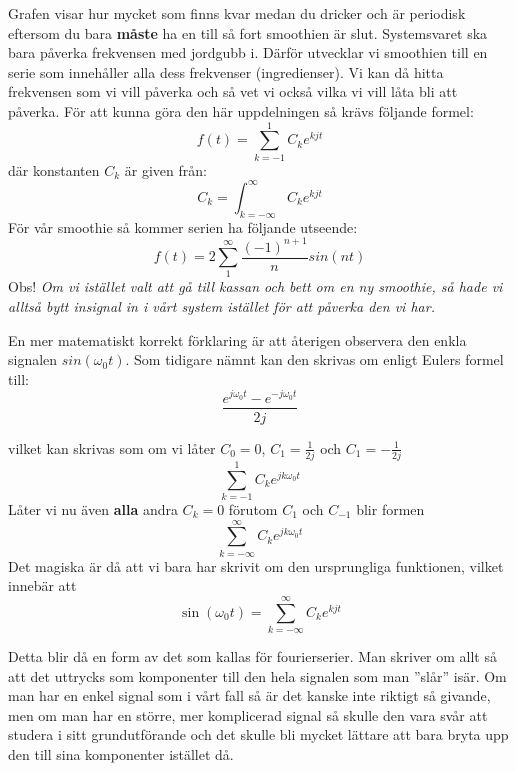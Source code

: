 \documentclass{article}
\begin{document}
Grafen visar hur mycket som finns kvar medan du dricker och är periodisk
eftersom du bara \textbf{måste} ha en till så fort smoothien är slut.
Systemsvaret ska bara påverka frekvensen med jordgubb i.
Därför utvecklar vi smoothien till en serie som innehåller alla dess
frekvenser (ingredienser). Vi kan då hitta frekvensen som vi vill påverka och
så vet vi också vilka vi vill låta bli att påverka.
För att kunna göra den här uppdelningen så krävs följande formel:
\begin{displaymath}
  f(t) = \sum_{k=-1}^1 C_k e^{k j t}
\end{displaymath}
där konstanten $C_k$ är given från:
\begin{displaymath}
  C_k = \int_{k=-\infty}^{\infty} C_k e^{k j t}
\end{displaymath}
För vår smoothie så kommer serien ha följande utseende:
\begin{displaymath}
  f(t) = 2 \sum_{1}^{\infty} \frac{(-1)^{n+1}}{n} sin(n t)
\end{displaymath}
Obs! \emph{Om vi istället valt att gå till kassan och bett om en ny smoothie,
  så hade vi alltså bytt insignal in i vårt system istället för att påverka den vi har.}

En mer matematiskt korrekt förklaring är att återigen observera den enkla
signalen $sin(\omega_0 t)$. Som tidigare nämnt kan den skrivas om enligt Eulers
formel till:
\begin{displaymath}
  \frac{e^{j \omega_0 t} - e^{-j \omega_0 t}}{2j}
\end{displaymath}

vilket kan skrivas som om vi låter $C_0=0$, $C_{1}=\frac{1}{2j}$ och
$C_{1}=-\frac{1}{2j}$
\begin{displaymath}
  \sum_{k=-1}^1 C_k e^{j k \omega_0 t}
\end{displaymath}
Låter vi nu även \textbf{alla} andra $C_k = 0$ förutom  $C_1$ och $C_{-1}$ blir formen
\begin{displaymath}
  \sum_{k=-\infty}^{\infty} C_k e^{j k \omega_0 t}
\end{displaymath}
Det magiska är då att vi bara har skrivit om den ursprungliga funktionen,
vilket innebär att
\begin{displaymath}
  \sin(\omega_0 t) = \sum_{k=-\infty}^{\infty} C_k e^{k j t}
\end{displaymath}

Detta blir då en form av det som kallas för fourierserier.
Man skriver om allt så att det uttrycks som komponenter till den hela signalen
som man ''slår'' isär. Om man har en enkel signal som i vårt fall så är det
kanske inte riktigt så givande, men om man har en större,
mer komplicerad signal så skulle den vara svår att studera i sitt
grundutförande och det skulle bli mycket lättare att bara bryta upp den
till sina komponenter istället då.
\end{document}
